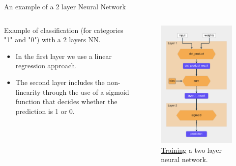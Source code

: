 \documentclass{beamer}
\begin{document}
\begin{frame}{An example of a 2 layer Neural Network}
    \begin{columns}
        \begin{column}{0.6\linewidth}     
            Example of classification (for categories "1" and "0") with a 2 layers NN. 
            \begin{itemize}
                \item In the first layer we use a linear regression approach.
                \item The second layer includes the non-linearity through the use of a sigmoid function that decides whether the prediction is 1 or 0.
            \end{itemize}
        \end{column}
        \begin{column}{0.4\linewidth}
            \begin{figure}
                \includegraphics[width=0.7\linewidth]{Training2Layer}
                \caption{\href{https://realpython.com/python-ai-neural-network/}{Training} a two layer neural network.}
                \label{Fig:Training2Layer}
            \end{figure}
        \end{column}
     \end{columns}
\end{frame}
\end{document}
